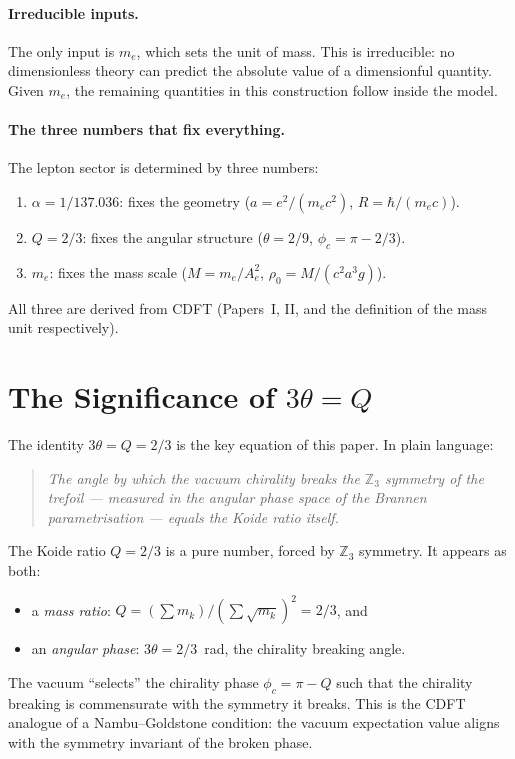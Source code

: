 \documentclass[11pt]{article}
\begin{document}
\paragraph{Irreducible inputs.}
The only input is $m_e$, which sets the unit of mass.
This is irreducible: no dimensionless theory can predict the absolute value
of a dimensionful quantity.
Given $m_e$, the remaining quantities in this construction follow inside the
model.

\paragraph{The three numbers that fix everything.}
The lepton sector is determined by three numbers:
\begin{enumerate}
  \item $\alpha = 1/137.036$: fixes the geometry ($a = e^2/(m_e c^2)$, $R = \hbar/(m_e c)$).
  \item $Q = 2/3$: fixes the angular structure ($\theta = 2/9$, $\phi_c = \pi - 2/3$).
  \item $m_e$: fixes the mass scale ($M = m_e/A_e^2$, $\rho_0 = M/(c^2 a^3 g)$).
\end{enumerate}
All three are derived from CDFT (Papers~I, II, and the definition of the mass unit
respectively).


\section{The Significance of $3\theta = Q$}

The identity $3\theta = Q = 2/3$ is the key equation of this paper.
In plain language:

\begin{quote}
  \emph{The angle by which the vacuum chirality breaks the $\mathbb{Z}_3$
  symmetry of the trefoil --- measured in the angular phase space of the
  Brannen parametrisation --- equals the Koide ratio itself.}
\end{quote}

The Koide ratio $Q = 2/3$ is a pure number, forced by $\mathbb{Z}_3$
symmetry.
It appears as both:
\begin{itemize}
  \item a \emph{mass ratio}: $Q = (\sum m_k)/(\sum \sqrt{m_k})^2 = 2/3$, and
  \item an \emph{angular phase}: $3\theta = 2/3$~rad, the chirality breaking angle.
\end{itemize}

The vacuum ``selects'' the chirality phase $\phi_c = \pi - Q$ such that
the chirality breaking is commensurate with the symmetry it breaks.
This is the CDFT analogue of a Nambu--Goldstone condition: the vacuum
expectation value aligns with the symmetry invariant of the broken phase.
\end{document}
